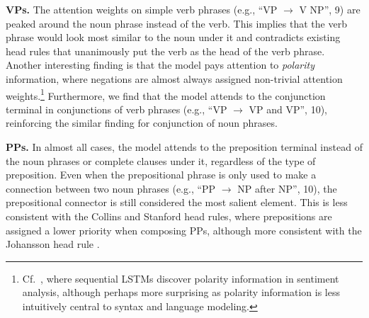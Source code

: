 \documentclass[11pt]{article}
\newcommand{\ask}[1]{\textcolor{orange}{{\textbf{[#1 --\textsc{ask}]}}}}
\renewcommand{\ask}[1]{}
\begin{document}
\textbf{VPs.} The attention weights on simple verb phrases (e.g., ``VP $\to$ V NP'', 9) are peaked around the noun phrase instead of the verb. This implies that the verb phrase would look most similar to the noun under it and contradicts existing head rules that unanimously put the verb as the head of the verb phrase. 
Another interesting finding is that the model pays attention to \emph{polarity} information, where negations are almost always assigned non-trivial attention weights.\footnote{Cf.~, where sequential LSTMs discover polarity information in sentiment analysis, although perhaps more surprising as polarity information is less intuitively central to syntax and language modeling.} Furthermore, we find that the model attends to the conjunction terminal in conjunctions of verb phrases (e.g., ``VP $\to$ VP and VP'', 10), reinforcing the similar finding for conjunction of noun phrases.

\textbf{PPs.} In almost all cases, the model attends to the preposition terminal instead of the noun phrases or complete clauses under it, regardless of the type of preposition. Even when the prepositional phrase is only used to make a connection between two noun phrases (e.g., ``PP $\to$ NP after NP'', 10), the prepositional connector is still considered the most salient element. This is less consistent with the Collins and Stanford head rules, where prepositions are assigned a lower priority when composing PPs, although more consistent with the Johansson head rule \cite{Johansson:07}.\ask{To my understanding there is some contention on what the head of a preposition phrase should be. Some might say that the preposition symbol is not important and we should instead pay attention to whatever is under it, but some others say that the preposition symbol is indeed the head. I'm not sure how to formulate this, we should probably cite some previous works that talk and discuss about this.} 





\mydata
\end{document}
